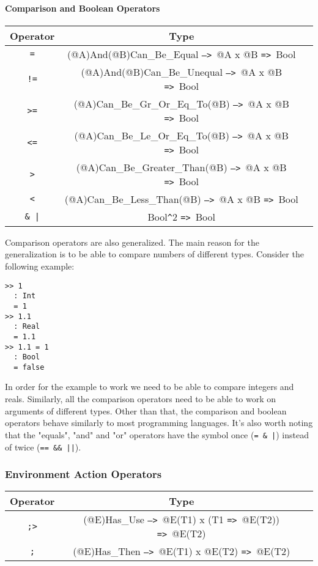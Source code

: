 \documentclass{article}
\def\ra{\texttt{=>}\ }
\def\Ra{\texttt{-->}\ }
\begin{document}
\paragraph{Comparison and Boolean Operators}

\begin{center}
\begin{tabular}{ |c|c|c| } 
\hline
Operator & Type
\\ 
\hline
\hline
\texttt{=} & (@A)And(@B)Can_Be_Equal \Ra @A x @B \ra Bool
\\
\hline
\texttt{!=} & (@A)And(@B)Can_Be_Unequal \Ra @A x @B \ra Bool
\\
\hline
\texttt{>=} & (@A)Can_Be_Gr_Or_Eq_To(@B) \Ra @A x @B \ra Bool
\\
\hline
\texttt{<=} & (@A)Can_Be_Le_Or_Eq_To(@B) \Ra @A x @B \ra Bool
\\
\hline
\texttt{>} & (@A)Can_Be_Greater_Than(@B) \Ra @A x @B \ra Bool
\\
\hline
\texttt{<} & (@A)Can_Be_Less_Than(@B) \Ra @A x @B \ra Bool
\\
\hline
\texttt{\& |} & Bool\texttt{\^}2 \ra Bool
\\
\hline
\end{tabular}
\end{center}
Comparison operators are also generalized. The main reason for the
generalization is to be able to compare numbers of different types. Consider
the following example:

\begin{verbatim}
>> 1
  : Int
  = 1
>> 1.1
  : Real
  = 1.1
>> 1.1 = 1
  : Bool
  = false
\end{verbatim}
In order for the example to work we need to be able to compare integers and
reals.  Similarly, all the comparison operators need to be able to work on
arguments of different types. Other than that, the comparison and boolean
operators behave similarly to most programming languages. It's also worth
noting that the "equals", "and" and "or" operators have the symbol once
(\texttt{= \& |}) instead of twice (\texttt{== \&\& ||}).

\newpage

\subsubsection{Environment Action Operators}
\label{subsec:envacts}

\begin{center}
\begin{tabular}{ |c|c|c| } 
\hline
Operator & Type
\\ 
\hline
\hline
\texttt{;>} & (@E)Has_Use \Ra @E(T1) x (T1 \ra @E(T2)) \ra @E(T2)
\\
\hline
\texttt{;} & (@E)Has_Then \Ra @E(T1) x @E(T2) \ra @E(T2)
\\
\hline
\end{tabular}
\end{center}
\end{document}
